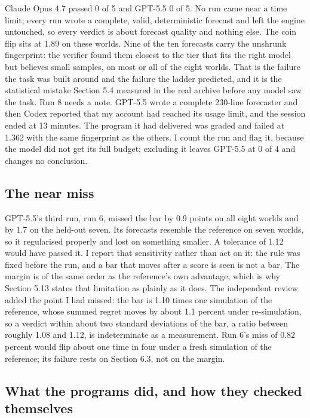 \documentclass[11pt,letterpaper]{article}
\begin{document}
Claude Opus 4.7 passed 0 of 5 and GPT-5.5 0 of 5. No run came near a time limit; every run wrote a complete, valid, deterministic forecast and left the engine untouched, so every verdict is about forecast quality and nothing else. The coin flip sits at 1.89 on these worlds. Nine of the ten forecasts carry the unshrunk fingerprint: the verifier found them closest to the tier that fits the right model but believes small samples, on most or all of the eight worlds. That is the failure the task was built around and the failure the ladder predicted, and it is the statistical mistake Section 5.4 measured in the real archive before any model saw the task. Run 8 needs a note. GPT-5.5 wrote a complete 230-line forecaster and then Codex reported that my account had reached its usage limit, and the session ended at 13 minutes. The program it had delivered was graded and failed at 1.362 with the same fingerprint as the others. I count the run and flag it, because the model did not get its full budget; excluding it leaves GPT-5.5 at 0 of 4 and changes no conclusion.


\subsection{The near miss}

GPT-5.5's third run, run 6, missed the bar by 0.9 points on all eight worlds and by 1.7 on the held-out seven. Its forecasts resemble the reference on seven worlds, so it regularised properly and lost on something smaller. A tolerance of 1.12 would have passed it. I report that sensitivity rather than act on it: the rule was fixed before the run, and a bar that moves after a score is seen is not a bar. The margin is of the same order as the reference's own advantage, which is why Section 5.13 states that limitation as plainly as it does. The independent review added the point I had missed: the bar is 1.10 times one simulation of the reference, whose summed regret moves by about 1.1 percent under re-simulation, so a verdict within about two standard deviations of the bar, a ratio between roughly 1.08 and 1.12, is indeterminate as a measurement. Run 6's miss of 0.82 percent would flip about one time in four under a fresh simulation of the reference; its failure rests on Section 6.3, not on the margin.


\subsection{What the programs did, and how they checked themselves}
\end{document}
